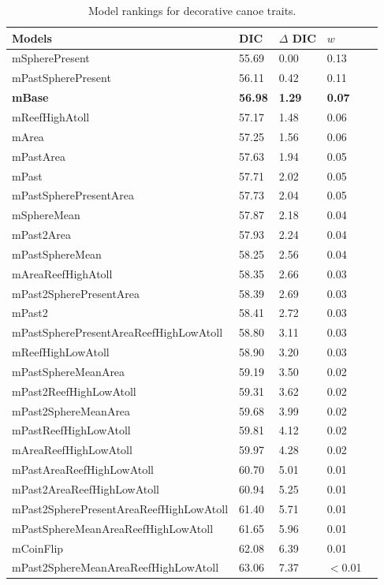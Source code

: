 \begin{table}
\begin{center}
\begin{tabular}{lllll}
Models & DIC & $\Delta$ DIC & $w$\\
\hline
mSpherePresent & 55.69 & 0.00 & 0.13\\
mPastSpherePresent & 56.11 & 0.42 & 0.11\\
\textbf{mBase} & \textbf{56.98} & \textbf{1.29} & \textbf{0.07}\\
mReefHighAtoll & 57.17 & 1.48 & 0.06\\
mArea & 57.25 & 1.56 & 0.06\\
mPastArea & 57.63 & 1.94 & 0.05\\
mPast & 57.71 & 2.02 & 0.05\\
mPastSpherePresentArea & 57.73 & 2.04 & 0.05\\
mSphereMean & 57.87 & 2.18 & 0.04\\
mPast2Area & 57.93 & 2.24 & 0.04\\
mPastSphereMean & 58.25 & 2.56 & 0.04\\
mAreaReefHighAtoll & 58.35 & 2.66 & 0.03\\
mPast2SpherePresentArea & 58.39 & 2.69 & 0.03\\
mPast2 & 58.41 & 2.72 & 0.03\\
mPastSpherePresentAreaReefHighLowAtoll & 58.80 & 3.11 & 0.03\\
mReefHighLowAtoll & 58.90 & 3.20 & 0.03\\
mPastSphereMeanArea & 59.19 & 3.50 & 0.02\\
mPast2ReefHighLowAtoll & 59.31 & 3.62 & 0.02\\
mPast2SphereMeanArea & 59.68 & 3.99 & 0.02\\
mPastReefHighLowAtoll & 59.81 & 4.12 & 0.02\\
mAreaReefHighLowAtoll & 59.97 & 4.28 & 0.02\\
mPastAreaReefHighLowAtoll & 60.70 & 5.01 & 0.01\\
mPast2AreaReefHighLowAtoll & 60.94 & 5.25 & 0.01\\
mPast2SpherePresentAreaReefHighLowAtoll & 61.40 & 5.71 & 0.01\\
mPastSphereMeanAreaReefHighLowAtoll & 61.65 & 5.96 & 0.01\\
mCoinFlip & 62.08 & 6.39 & 0.01\\
mPast2SphereMeanAreaReefHighLowAtoll & 63.06 & 7.37 & $<$0.01\\

\end{tabular}
\end{center}
\caption{Model rankings for decorative canoe traits.
\label{resultstable2}}
\end{table}




